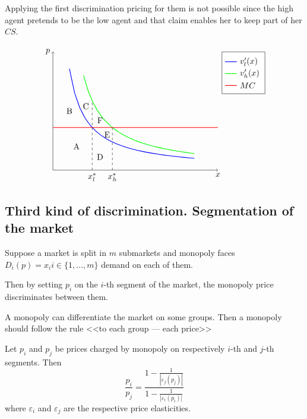 \documentclass[a4paper, 10pt]{article}
\begin{document}
Applying the first discrimination pricing for them is not possible since the high agent pretends to be the low agent and that claim enables her to keep part of her $CS$.

$$
\begin{tikzpicture}
    \draw[->] (0,0) -- (7,0) node[below] {$x$};
    \draw[->] (0,0) -- (0,5) node[left] {$p$};

    \draw[blue, thick, domain=0.7:6] plot (\x, {3/\x}) node[right] {};

    \draw[green, thick, domain=1.3:6] plot (\x, {4/(\x-0.3)}) node[right] {};

    \draw[red, thick] (0,1.8) -- (7,1.8);

    \draw[dashed] (1.66667,0) node[below] {$x_l^*$} -- (1.66667, 2.92682);
    \draw[dashed] (2.52222,0) node[below] {$x_h^*$} -- (2.52222, 1.8);

    \node at (0.7,2.5) {B};
    \node at (1,1) {A};
    \node at (1.4,2.7) {C};
    \node at (2,0.56) {D};
    \node at (2,2.1) {F};
    \node at (2.3,1.5) {E};

    \node[draw, anchor=north east,fill=white] at (9,5) {
    \begin{tikzpicture}
        \draw[blue, thick] (0,0) -- (0.5,0) node[right, text=black] {\(v^{\prime}_l(x)\)};
        \draw[green, thick] (0,-0.5) -- (0.5,-0.5) node[right, text=black] {\(v^{\prime}_h(x)\)};
        \draw[red, thick] (0,-1) -- (0.5,-1) node[right, text=black] {\(MC\)};
    \end{tikzpicture}
    };
\end{tikzpicture}
$$


\subsection{Third kind of discrimination. Segmentation of the market}
Suppose a market is split in $m$ submarkets and monopoly faces $D_i(p)=x_i i \in\{1, \ldots, m\}$ demand on each of them.

Then by setting $p_i$ on the $i$-th segment of the market, the monopoly price discriminates between them.

A monopoly can differentiate the market on some groups. Then a monopoly should follow the rule <<to each group — each price>>


\proposition Let $p_i$ and $p_j$ be prices charged by monopoly on respectively $i$-th and $j$-th segments. Then
$$
\frac{p_i}{p_j}=\frac{1-\frac{1}{\left|\varepsilon_j\left(p_j\right)\right|}}{1-\frac{1}{\left|\varepsilon_i\left(p_i\right)\right|}}
$$
where $\varepsilon_i$ and $\varepsilon_j$ are the respective price elasticities.
\end{document}
